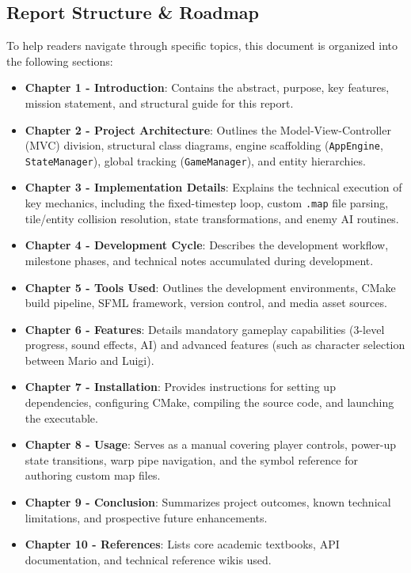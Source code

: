 \documentclass[12pt, a4paper]{article}
\begin{document}
\subsection*{Report Structure \& Roadmap}
To help readers navigate through specific topics, this document is organized into the following sections:

\begin{itemize}
\item \textbf{Chapter 1  -  Introduction}: Contains the abstract, purpose, key features, mission statement, and structural guide for this report.
\item \textbf{Chapter 2  -  Project Architecture}: Outlines the Model-View-Controller (MVC) division, structural class diagrams, engine scaffolding (\texttt{AppEngine}, \texttt{StateManager}), global tracking (\texttt{GameManager}), and entity hierarchies.
\item \textbf{Chapter 3  -  Implementation Details}: Explains the technical execution of key mechanics, including the fixed-timestep loop, custom \texttt{.map} file parsing, tile/entity collision resolution, state transformations, and enemy AI routines.
\item \textbf{Chapter 4  -  Development Cycle}: Describes the development workflow, milestone phases, and technical notes accumulated during development.
\item \textbf{Chapter 5  -  Tools Used}: Outlines the development environments, CMake build pipeline, SFML framework, version control, and media asset sources.
\item \textbf{Chapter 6  -  Features}: Details mandatory gameplay capabilities (3-level progress, sound effects, AI) and advanced features (such as character selection between Mario and Luigi).
\item \textbf{Chapter 7  -  Installation}: Provides instructions for setting up dependencies, configuring CMake, compiling the source code, and launching the executable.
\item \textbf{Chapter 8  -  Usage}: Serves as a manual covering player controls, power-up state transitions, warp pipe navigation, and the symbol reference for authoring custom map files.
\item \textbf{Chapter 9  -  Conclusion}: Summarizes project outcomes, known technical limitations, and prospective future enhancements.
\item \textbf{Chapter 10  -  References}: Lists core academic textbooks, API documentation, and technical reference wikis used.
\end{itemize}
\end{document}
